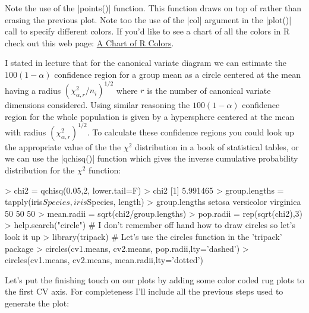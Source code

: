 Note the use of the |points()| function. This function draws on top of rather than erasing the previous plot.  Note too the use of the |col| argument in the |plot()| call to specify different colors.  If you'd like to see a chart of all the colors in R check out this web page: \href{http://research.stowers-institute.org/efg/R/Color/Chart/}{A Chart of R Colors}.

I stated in lecture that for the canonical variate diagram we can estimate the $100(1-\alpha)$ confidence region for a group mean as a circle centered at the mean having a radius $(\chi^{2}_{\alpha,r}/n_i)^{1/2}$ where $r$ is the number of canonical variate dimensions considered. Using similar reasoning the $100(1-\alpha)$ confidence region for the whole population is given by a hypersphere centered at the mean with radius $(\chi^{2}_{\alpha,r})^{1/2}$.  
To calculate these confidence regions you could look up the appropriate value of the the  $\chi^2$ distribution in a book of statistical tables, or we can use the |qchisq()| function which gives the inverse cumulative probability distribution for the $\chi^2$ function:

\begin{R}
> chi2 = qchisq(0.05,2, lower.tail=F)
> chi2
[1] 5.991465
> group.lengths = tapply(iris$Species, iris$Species, length)
> group.lengths
    setosa versicolor  virginica 
        50         50         50 
> mean.radii = sqrt(chi2/group.lengths)
> pop.radii = rep(sqrt(chi2),3)
> help.search("circle")  # I don't remember off hand how to draw circles so let's look it up
> library(tripack) # Let's use the circles function in the 'tripack' package
> circles(cv1.means, cv2.means, pop.radii,lty='dashed') 
> circles(cv1.means, cv2.means, mean.radii,lty='dotted')
\end{R}

Let's put the finishing touch on our plots by adding some color coded rug plots to the first CV axis. For completeness I'll include all the previous steps used to generate the plot:



